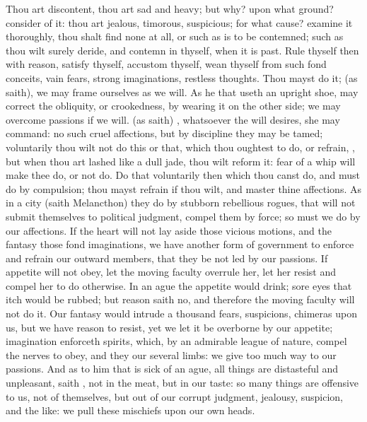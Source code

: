{Thou art discontent, thou art sad and heavy; but why? upon what ground?
consider of it: thou art jealous, timorous, suspicious; for what cause?
examine it thoroughly, thou shalt find none at all, or such as is to be
contemned; such as thou wilt surely deride, and contemn in thyself,
when it is past. Rule thyself then with reason, satisfy thyself,
accustom thyself, wean thyself from such fond conceits, vain fears,
strong imaginations, restless thoughts. Thou mayst do it;  (as \Plutarch saith), we may frame ourselves as we will. As
he that useth an upright shoe, may correct the obliquity, or
crookedness, by wearing it on the other side; we may overcome passions
if we will.  (as \Seneca
saith) ,
whatsoever the will desires, she may command: no such cruel affections,
but by discipline they may be tamed; voluntarily thou wilt not do this
or that, which thou oughtest to do, or refrain, \etc{}, but when thou art
lashed like a dull jade, thou wilt reform it: fear of a whip will make
thee do, or not do. Do that voluntarily then which thou canst do, and
must do by compulsion; thou mayst refrain if thou wilt, and master
thine affections. As in a city (saith Melancthon) they do by
stubborn rebellious rogues, that will not submit themselves to
political judgment, compel them by force; so must we do by our
affections. If the heart will not lay aside those vicious motions, and
the fantasy those fond imaginations, we have another form of government
to enforce and refrain our outward members, that they be not led by our
passions. If appetite will not obey, let the moving faculty overrule
her, let her resist and compel her to do otherwise. In an ague the
appetite would drink; sore eyes that itch would be rubbed; but reason
saith no, and therefore the moving faculty will not do it. Our fantasy
would intrude a thousand fears, suspicions, chimeras upon us, but we
have reason to resist, yet we let it be overborne by our appetite;
imagination enforceth spirits, which, by an admirable league of
nature, compel the nerves to obey, and they our several limbs: we give
too much way to our passions. And as to him that is sick of an ague,
all things are distasteful and unpleasant,  saith
\Plutarch, not in the meat, but in our taste: so many things are
offensive to us, not of themselves, but out of our corrupt judgment,
jealousy, suspicion, and the like: we pull these mischiefs upon our own
heads.

}
